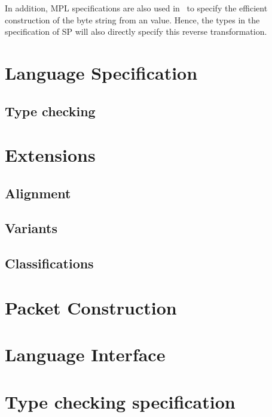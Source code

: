 \documentclass{article}
\begin{document}
In addition, MPL specifications are also used
in~\cite{Madhavapeddy:thesis} to specify the efficient construction of
the byte string from an \OCaml value.  Hence, the types in the
specification of SP will also directly specify this reverse
transformation.

\section{Language Specification}


\subsection{Type checking}

\section{Extensions}

\subsection{Alignment}
\subsection{Variants}
\subsection{Classifications}

\section{Packet Construction}

\section{Language Interface}

\section{Type checking specification}



\ottall



\end{document}
